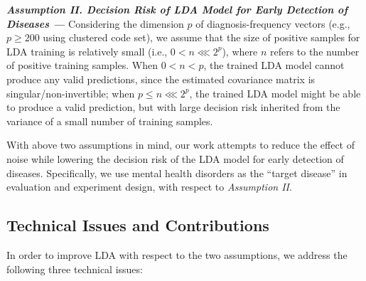 \textbf{\em Assumption II.  Decision Risk of LDA Model for Early Detection of Diseases --- } 
Considering the dimension $p$ of diagnosis-frequency vectors (e.g., $p\geq 200$ using clustered code set), we assume that the size of positive samples for LDA training is relatively small (i.e., $0<n\lll 2^p$), where $n$ refers to the number of positive training samples.
When $0<n<p$, the trained LDA model cannot produce any valid predictions, since the estimated covariance matrix is singular/non-invertible; when $p\leq n\lll 2^p$, the trained LDA model might be able to produce a valid prediction, but with large decision risk inherited from the variance of a small number of training samples.
 

With above two assumptions in mind, our work attempts to reduce the effect of noise while lowering the decision risk of the LDA model for early detection of diseases.
Specifically, we use mental health disorders as the ``target disease'' in evaluation and experiment design, with respect to {\em Assumption II}.


\subsection{Technical Issues and Contributions} 
In order to improve LDA with respect to the two assumptions, we address the following three technical issues:

